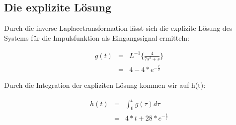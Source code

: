 \subsection{Die explizite Lösung}

Durch die inverse Laplacetransformation lässt sich die explizite Lösung des Systems für die Impulsfunktion als Eingangssignal ermitteln:

\begin{eqnarray*}
	g(t) &=& L^{-1}\{\frac{4}{7s^2 + s}\} \\ 
	&=& 4 - 4*e^{-\frac{t}{7}}
\end{eqnarray*}


Durch die Integration der expliziten Lösung kommen wir auf h(t):

\begin{eqnarray*}
	h(t) &=& \int_{0}^{t}g(\tau)d\tau \\ 
	&=& 4 * t + 28*e^{-\frac{t}{7}}
\end{eqnarray*}